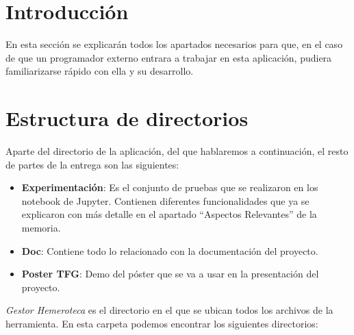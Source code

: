 
\section{Introducción}

En esta sección se explicarán todos los apartados necesarios para que, en el caso de que un programador externo entrara a trabajar en esta aplicación, pudiera familiarizarse rápido con ella y su desarrollo.

\section{Estructura de directorios}

Aparte del directorio de la aplicación, del que hablaremos a continuación, el resto de partes de la entrega son las siguientes:

\begin{itemize}

\item \textbf{Experimentación}: Es el conjunto de pruebas que se realizaron en los notebook de Jupyter. Contienen diferentes funcionalidades que ya se explicaron con más detalle en el apartado ``Aspectos Relevantes'' de la memoria. 

\item \textbf{Doc}: Contiene todo lo relacionado con la documentación del proyecto.

\item  \textbf{Poster TFG}: Demo del póster que se va a usar en la presentación del proyecto.

\end{itemize}

\emph{Gestor Hemeroteca} es el directorio en el que se ubican todos los archivos de la herramienta. En esta carpeta podemos encontrar los siguientes directorios:

